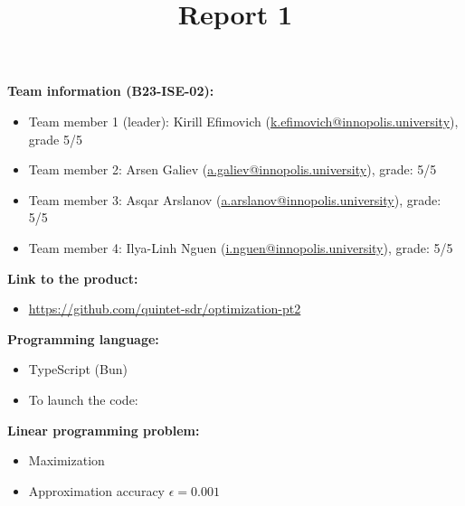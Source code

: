 \documentclass{article}
\title{\textbf{Report 1}}
\author{}
\date{}
\newcommand{\Gap}{0.25in}
\begin{document}
\maketitle

\thispagestyle{fancy}

\textbf{Team information (B23-ISE-02):}
\begin{itemize}
    \item Team member 1 (leader): Kirill Efimovich (\href{mailto:k.efimovich@innopolis.university}{k.efimovich@innopolis.university}), grade 5/5
    \item Team member 2: Arsen Galiev (\href{mailto:a.galiev@innopolis.university}{a.galiev@innopolis.university}), grade: 5/5
    \item Team member 3: Asqar Arslanov (\href{mailto:a.arslanov@innopolis.university}{a.arslanov@innopolis.university}), grade: 5/5
    \item Team member 4: Ilya-Linh Nguen (\href{mailto:i.nguen@innopolis.university}{i.nguen@innopolis.university}), grade: 5/5
\end{itemize}

\vspace{\Gap}

\textbf{Link to the product:}
\begin{itemize}
    \item \url{https://github.com/quintet-sdr/optimization-pt2}
\end{itemize}

\vspace{\Gap}

\textbf{Programming language:}
\begin{itemize}
    \item TypeScript (Bun)
    \item To launch the code: 
\end{itemize}

\vspace{\Gap}

\textbf{Linear programming problem:}
\begin{itemize}
    \item Maximization
    \item Approximation accuracy \(\epsilon = 0.001\)
\end{itemize}

\vspace{\Gap}
\end{document}

